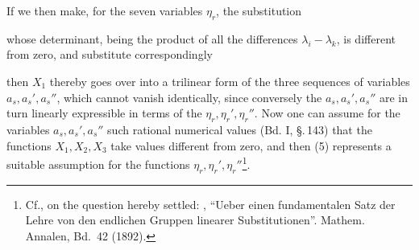 If we then make, for the seven variables $\eta_r$, the substitution


whose determinant, being the product of all the differences $\lambda_i - \lambda_k$, is different from zero, and substitute correspondingly


then $X_1$ thereby goes over into a trilinear form of the three sequences of variables $a_s, a_s', a_s''$, which cannot vanish identically, since conversely the $a_s, a_s', a_s''$ are in turn linearly expressible in terms of the $\eta_r, \eta_r', \eta_r''$. Now one can assume for the variables $a_s, a_s', a_s''$ such rational numerical values (Bd. I, §.\,143) that the functions $X_1, X_2, X_3$ take values different from zero, and then (5) represents a suitable assumption for the functions $\eta_r, \eta_r', \eta_r''$\footnote{Cf., on the question hereby settled: , ``Ueber einen fundamentalen Satz der Lehre von den endlichen Gruppen linearer Substitutionen''. Mathem. Annalen, Bd.\ 42 (1892).}.
